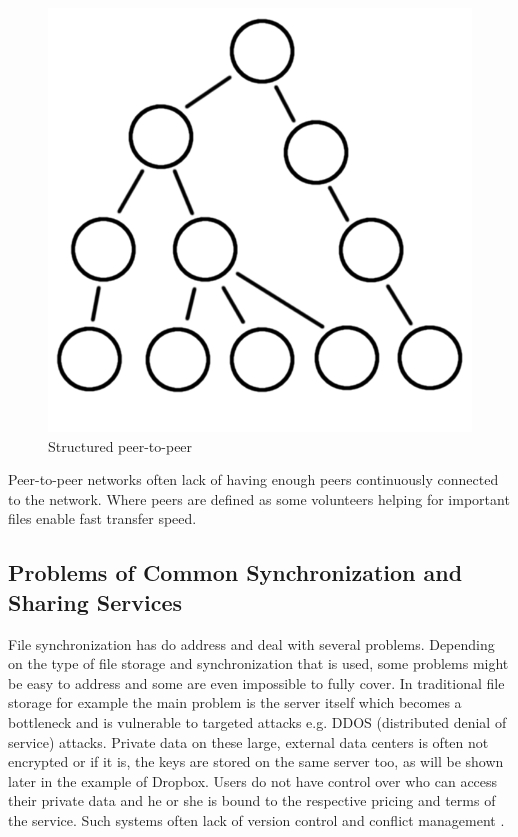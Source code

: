 \begin{enumerate}
\begin{figure}[H]
\begin{center}
		\includegraphics[scale=0.2]{Talk5/structured_p2p.PNG}
		\end{center}
		\caption{Structured peer-to-peer}
		\label{structured_p2p}
	\end{figure}
\end{enumerate}

Peer-to-peer networks often lack of having enough peers continuously connected to the network. Where peers are defined as some volunteers helping for important files enable fast transfer speed.

\subsection{Problems of Common Synchronization and Sharing Services}
File synchronization has do address and deal with several problems. Depending on the type of file storage and synchronization that is used, some problems might be easy to address and some are even impossible to fully cover. In traditional file storage for example the main problem is the server itself which becomes a bottleneck and is vulnerable to targeted attacks e.g. DDOS (distributed denial of service) attacks. Private data on these large, external data centers is often not encrypted or if it is, the keys are stored on the same server too, as will be shown later in the example of Dropbox. Users do not have control over who can access their private data and he or she is bound to the respective pricing and terms of the service. Such systems often lack of version control and conflict management \cite{hive2hive}.

